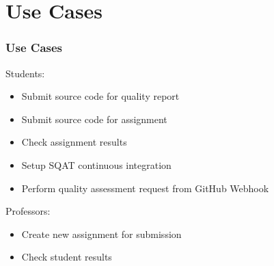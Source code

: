 \section{Use Cases}
\begin{frame}
\frametitle{Use Cases}

Students:
\begin{itemize}
  \item Submit source code for quality report
  \item Submit source code for assignment
  \item Check assignment results
  \item Setup SQAT continuous integration
  \item Perform quality assessment request from GitHub Webhook
\end{itemize}

Professors:
\begin{itemize}
  \item Create new assignment for submission
  \item Check student results
\end{itemize}
\end{frame}
